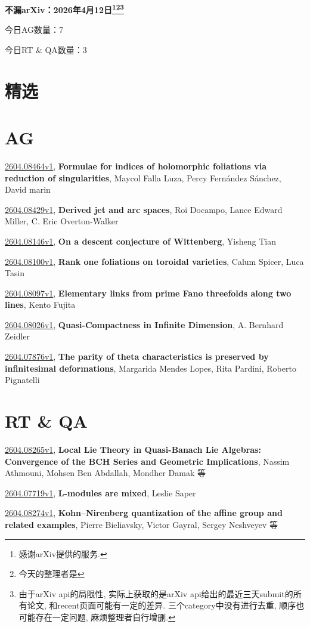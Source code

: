 \documentclass[9pt, a4paper]{article}
\theoremstyle{plain}
\theoremstyle{definition}
\theoremstyle{remark}
\newcommand{\arxiv}[3]{\href{https://arxiv.org/abs/#1}{#1}, \textbf{\textcolor{arxivblue}{#2}}, #3}
\newcommand{\AGnumber}{7}
\newcommand{\RTQAnumber}{3}
\newcommand{\NewestDate}{2026年4月12日}
\newcommand{\todayarXiver}{} %
\begin{document}
\begin{center}
    \Huge\textbf{不漏arXiv：\NewestDate\footnote{感谢arXiv提供的服务.}\footnote{今天的整理者是\todayarXiver}\footnote{由于arXiv api的局限性, 实际上获取的是arXiv api给出的最近三天submit的所有论文, 和recent页面可能有一定的差异. 三个category中没有进行去重, 顺序也可能存在一定问题, 麻烦整理者自行增删.}} \\
\end{center}

\setcounter{section}{-1}

\begin{center}
    今日AG数量：\AGnumber
    
    今日RT \& QA数量：\RTQAnumber
    
\end{center}


\section{精选}


\section{AG}
\arxiv{2604.08464v1}{Formulae for indices of holomorphic foliations via reduction of singularities}{Maycol Falla Luza, Percy Fernández Sánchez, David marin}

\arxiv{2604.08429v1}{Derived jet and arc spaces}{Roi Docampo, Lance Edward Miller, C. Eric Overton-Walker}

\arxiv{2604.08146v1}{On a descent conjecture of Wittenberg}{Yisheng Tian}

\arxiv{2604.08100v1}{Rank one foliations on toroidal varieties}{Calum Spicer, Luca Tasin}

\arxiv{2604.08097v1}{Elementary links from prime Fano threefolds along two lines}{Kento Fujita}

\arxiv{2604.08026v1}{Quasi-Compactness in Infinite Dimension}{A. Bernhard Zeidler}

\arxiv{2604.07876v1}{The parity of theta characteristics is preserved by infinitesimal deformations}{Margarida Mendes Lopes, Rita Pardini, Roberto Pignatelli}


\section{RT \& QA}
\arxiv{2604.08265v1}{Local Lie Theory in Quasi-Banach Lie Algebras: Convergence of the BCH Series and Geometric Implications}{Nassim Athmouni, Mohsen Ben Abdallah, Mondher Damak 等}

\arxiv{2604.07719v1}{L-modules are mixed}{Leslie Saper}

\arxiv{2604.08274v1}{Kohn--Nirenberg quantization of the affine group and related examples}{Pierre Bieliavsky, Victor Gayral, Sergey Neshveyev 等}

\end{document}
